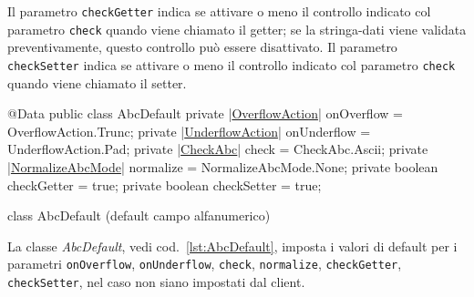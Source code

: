 \documentclass[a4paper,10pt]{report}
\newif\ifesource
\newenvironment{elisting}[1][H]
  {\captionsetup{aboveskip=0pt}\begin{listing}[#1]}
  {\end{listing}%
}
\begin{document}
Il parametro \hypertarget{abc:get}{\texttt{checkGetter}} indica se attivare o 
meno il controllo indicato col parametro \verb!check! quando viene chiamato il 
getter; se la stringa-dati viene validata preventivamente, questo controllo può 
essere disattivato.
Il parametro \hypertarget{abc:set}{\texttt{checkSetter}} indica se attivare o 
meno il controllo indicato col parametro \verb!check! quando viene chiamato il 
setter.

\ifesource
\begin{figure*}[!htb]
\begin{lstlisting}[language=java, 
caption=class AbcDefault (default campo alfanumerico), 
label=lst:AbcDefault]
@Data
public class AbcDefault {
    private (*\hyperref[lst:OverflowAction]{OverflowAction}*) onOverflow = OverflowAction.Trunc;
    private (*\hyperref[lst:UnderflowAction]{UnderflowAction}*) onUnderflow = UnderflowAction.Pad;
    private (*\hyperref[lst:CheckAbc]{CheckAbc}*) check = CheckAbc.Ascii;
    private (*\hyperref[lst:NormalizeAbcMode]{NormalizeAbcMode}*) normalize = NormalizeAbcMode.None;
    private boolean checkGetter = true;
    private boolean checkSetter = true;
}
\end{lstlisting}\index{AbcDefault}
\end{figure*}
\else
\begin{elisting}[!htb]
\begin{javacode}
@Data
public class AbcDefault {
    private |\hyperref[lst:OverflowAction]{OverflowAction}| onOverflow = OverflowAction.Trunc;
    private |\hyperref[lst:UnderflowAction]{UnderflowAction}| onUnderflow = UnderflowAction.Pad;
    private |\hyperref[lst:CheckAbc]{CheckAbc}| check = CheckAbc.Ascii;
    private |\hyperref[lst:NormalizeAbcMode]{NormalizeAbcMode}| normalize = NormalizeAbcMode.None;
    private boolean checkGetter = true;
    private boolean checkSetter = true;
}
\end{javacode}
\caption{class AbcDefault (default campo alfanumerico)}
\label{lst:AbcDefault}
\end{elisting}
\fi

La classe \textsl{AbcDefault}, vedi cod.~\ref{lst:AbcDefault}, imposta i valori
di default per i parametri \verb!onOverflow!, \verb!onUnderflow!, \verb!check!, 
\verb!normalize!, \verb!checkGetter!, \verb!checkSetter!, nel caso non siano 
impostati dal client.
\end{document}
